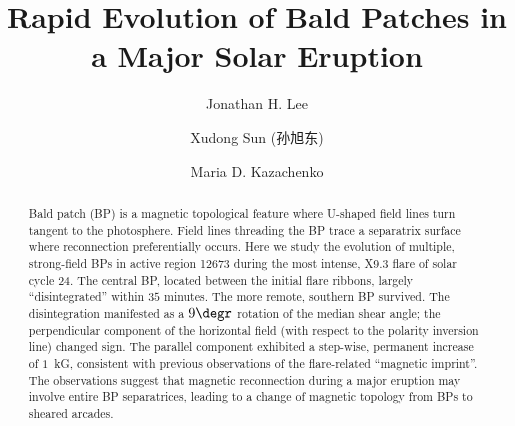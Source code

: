 \documentclass[times,twocolumn]{aastex631}
\begin{document}
\begin{CJK*}{UTF8}{gbsn}

\title{Rapid Evolution of Bald Patches in a Major Solar Eruption}

\author[0000-0001-7626-8386]{Jonathan H. Lee}

\author[0000-0003-4043-616X]{Xudong Sun (孙旭东)}

\author[0000-0001-8975-7605]{Maria D. Kazachenko}



\begin{abstract}
Bald patch (BP) is a magnetic topological feature where U-shaped field lines turn tangent to the photosphere. Field lines threading the BP trace a separatrix surface where reconnection preferentially occurs. Here we study the evolution of multiple, strong-field BPs in active region 12673 during the most intense, X9.3 flare of solar cycle 24. The central BP, located between the initial flare ribbons, largely ``disintegrated'' within $35$ minutes. The more remote, southern BP survived. The disintegration manifested as a $9\degr$ rotation of the median shear angle; the perpendicular component of the horizontal field (with respect to the polarity inversion line) changed sign. The parallel component exhibited a step-wise, permanent increase of $1$~kG, consistent with previous observations of the flare-related ``magnetic imprint''. The observations suggest that magnetic reconnection during a major eruption may involve entire BP separatrices, leading to a change of magnetic topology from BPs to sheared arcades.
\end{abstract}





\end{CJK*}
\end{document}
